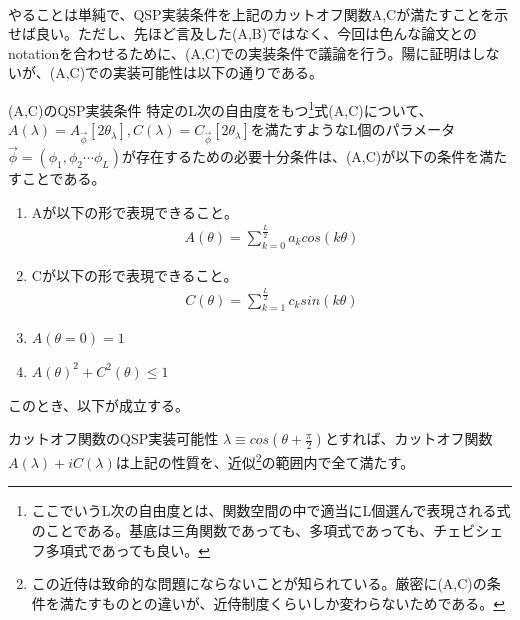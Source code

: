 \documentclass[a4paper,10.5pt]{article}
\numberwithin{equation}{section}
\begin{document}
\\
やることは単純で、QSP実装条件を上記のカットオフ関数A,Cが満たすことを示せば良い。ただし、先ほど言及した(A,B)ではなく、今回は色んな論文とのnotationを合わせるために、(A,C)での実装条件で議論を行う。陽に証明はしないが、(A,C)での実装可能性は以下の通りである。
\begin{theorembox}{(A,C)のQSP実装条件}
    特定のL次の自由度をもつ\footnote{ここでいうL次の自由度とは、関数空間の中で適当にL個選んで表現される式のことである。基底は三角関数であっても、多項式であっても、チェビシェフ多項式であっても良い。}式(A,C)について、$A(\lambda)=A_{\vec{\phi}}[2\theta_{\lambda}],C(\lambda)=C_{\vec{\phi}}[2\theta_{\lambda}]$を満たすようなL個のパラメータ$\vec{\phi}=(\phi_{1},\phi_{2}\cdots \phi_{L})$が存在するための必要十分条件は、(A,C)が以下の条件を満たすことである。
    \begin{enumerate}
        \item Aが以下の形で表現できること。
        \begin{align*}
            A(\theta)=\sum_{k=0}^{\frac{L}{2}}a_{k}cos(k\theta)
        \end{align*}
        \item Cが以下の形で表現できること。
        \begin{align*}
            C(\theta)=\sum_{k=1}^{\frac{L}{2}}c_{k}sin(k\theta)
        \end{align*}
        \item $A(\theta=0)=1$
        \item $A(\theta)^{2}+C^{2}(\theta)\leq 1$
    \end{enumerate}
\end{theorembox}
このとき、以下が成立する。
\begin{resultbox}{カットオフ関数のQSP実装可能性}
    $\lambda\equiv cos(\theta+\frac{\pi}{2})$とすれば、カットオフ関数$A(\lambda)+iC(\lambda)$は上記の性質を、近似\footnote{この近侍は致命的な問題にならないことが知られている。厳密に(A,C)の条件を満たすものとの違いが、近侍制度くらいしか変わらないためである。}の範囲内で全て満たす。
\end{resultbox}
\end{document}
